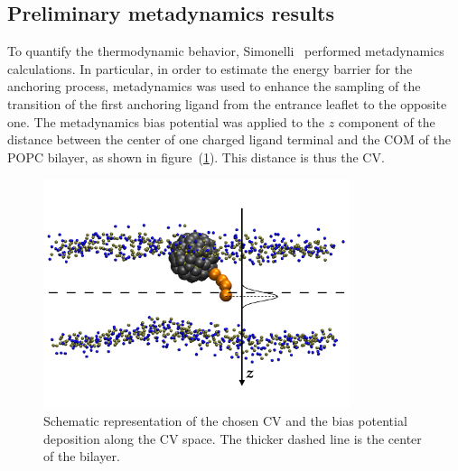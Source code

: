 \subsection{Preliminary metadynamics results}
\label{sec:preliminaryMetadyn}
To quantify the thermodynamic behavior, Simonelli \etal\, performed metadynamics calculations. In particular, in 
order to estimate the energy barrier for the anchoring process, metadynamics was used to enhance the sampling of 
the transition of the first anchoring ligand from the entrance leaflet to the opposite one. The metadynamics bias potential was applied to the $z$ component of the distance between the center of one charged ligand terminal and the \ac{COM} of the \ac{POPC} bilayer, as shown in figure~(\ref{fig:CVRappresentation}). This distance is thus the \ac{CV}.
\begin{figure}[ht!]
	\center
	\includegraphics[width=0.8\textwidth]{./img/CV/CV}
	\caption{Schematic representation of the chosen \acs{CV} and the bias potential deposition along the \acs{CV} space. The thicker dashed line is the center of the bilayer.}
	\label{fig:CVRappresentation}
\end{figure}

